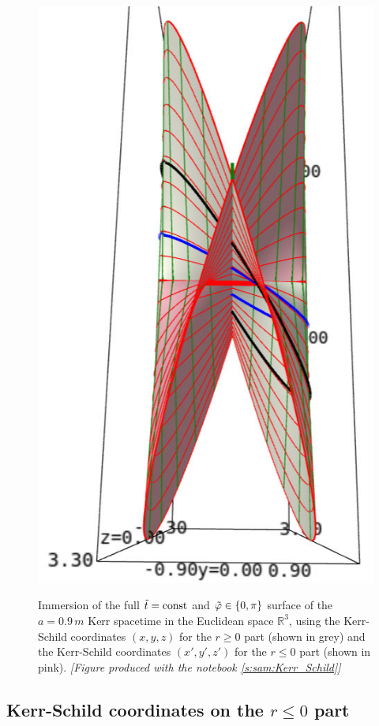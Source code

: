 \begin{figure}
{\includegraphics[height=0.3\textheight]{ksm_2_sheets_top.jpg}
}
\caption[]{\label{f:ksm:2_sheets} \footnotesize
Immersion of the full ${\tilde t}=\mathrm{const}$ and ${\tilde\varphi}\in\{0,\pi\}$ surface of the $a=0.9\, m$
Kerr spacetime in the Euclidean space $\mathbb{R}^3$, using the Kerr-Schild coordinates
$(x,y,z)$ for the $r\geq 0$ part (shown in grey) and the Kerr-Schild coordinates
$(x',y',z')$ for the $r\leq 0$ part (shown in pink).
\textsl{[Figure produced with the notebook \ref{s:sam:Kerr_Schild}]}
}
\end{figure}


\subsection{Kerr-Schild coordinates on the $r\leq 0$ part}

